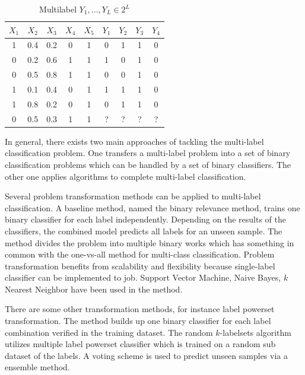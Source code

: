 \begin{table}
\centering
\begin{tabular}{|c c c c c | c c c c|}
\hline
$X_{1}$ & $X_{2}$ &  $X_{3}$ & $X_{4}$ & $X_{5}$ & $Y_{1}$ & $Y_{2}$ & $Y_{3}$ & $Y_{4}$ \\
\hline
1 & 0.4 & 0.2 & 0 & 1 & 0 & 1 & 1 & 0 \\
0 & 0.2 & 0.6 & 1 & 1 & 1 & 0 & 1 & 0 \\
0 & 0.5 & 0.8 & 1 & 1 & 0 & 0 & 1 & 0 \\
1 & 0.1 & 0.4 & 0 & 1 & 1 & 1 & 1 & 0 \\
1 & 0.8 & 0.2 & 0 & 1 & 0 & 1 & 1 & 0 \\
\hline
0 & 0.5 & 0.3 & 1 & 1 & ? & ? & ? & ? \\
\hline
\end{tabular}
\caption{Multilabel $Y_{1},...,Y_{L} \in 2^L$}
\label{tab:MultilabelTable}
\end{table}

In general, there exists two main approaches of tackling the multi-label classification problem. One transfers a multi-label problem into a set of binary classification problems which can be handled by a set of binary classifiers. The other one applies algorithms to complete multi-label classification. 

Several problem transformation methods can be applied to multi-label classification. A baseline method, named the binary relevance method\citep{read2011classifier}, trains one binary classifier for each label independently. Depending on the results of the classifiers, the combined model predicts all labels for an unseen sample. The method divides the problem into multiple binary works which has something in common with the one-vs-all method for multi-class classification. Problem transformation benefits from scalability and flexibility because single-label classifier can be implemented to job. Support Vector Machine, Naive Bayes, $k$ Nearest Neighbor have been used in the method\citep{read2011classifier}.

There are some other transformation methods, for instance label powerset transformation. The method builds up one binary classifier for each label combination verified in the training dataset\citep{tsoumakas2006multi}. The random $k$-labelsets algorithm\citep{tsoumakas2007random} utilizes multiple label powerset classifier which is trained on a random sub dataset of the labels. A voting scheme is used to predict unseen samples via a ensemble method.

